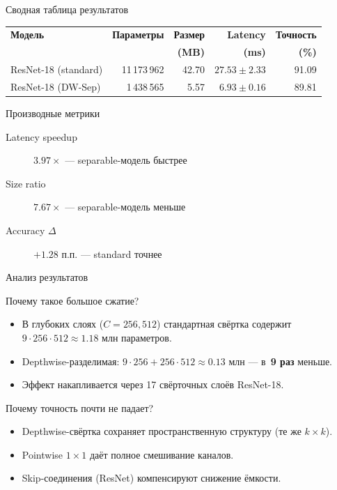 \documentclass[11pt,aspectratio=169]{beamer}
\begin{document}
\begin{frame}{Сводная таблица результатов}
  \centering
  \begin{tabular}{lrrrr}
    \toprule
    \textbf{Модель} & \textbf{Параметры} & \textbf{Размер} & \textbf{Latency} & \textbf{Точность} \\
                     &                     & \textbf{(MB)}   & \textbf{(ms)}    & \textbf{(\%)} \\
    \midrule
    ResNet-18 (standard)
        & 11\,173\,962 & 42.70 & \(27.53 \pm 2.33\) & 91.09 \\
    \addlinespace
    ResNet-18 (DW-Sep)
        & 1\,438\,565  & 5.57  & \(6.93 \pm 0.16\)  & 89.81 \\
    \bottomrule
  \end{tabular}

  \vspace{12pt}

  \begin{block}{Производные метрики}
    \begin{description}
      \item[Latency speedup] \(\mathbf{3.97\times}\) — separable-модель быстрее
      \item[Size ratio] \(\mathbf{7.67\times}\) — separable-модель меньше
      \item[Accuracy \(\Delta\)] \(+1.28\) п.п. — standard точнее
    \end{description}
  \end{block}
\end{frame}

\begin{frame}{Анализ результатов}
  \begin{block}{Почему такое большое сжатие?}
    \begin{itemize}
      \item В глубоких слоях (\(C = 256, 512\)) стандартная свёртка
            содержит \(9 \cdot 256 \cdot 512 \approx 1.18\) млн параметров.
      \item Depthwise-разделимая: \(9 \cdot 256 + 256 \cdot 512 \approx 0.13\) млн —
            в~\textbf{9 раз} меньше.
      \item Эффект накапливается через 17 свёрточных слоёв ResNet-18.
    \end{itemize}
  \end{block}

  \pause

  \begin{block}{Почему точность почти не падает?}
    \begin{itemize}
      \item Depthwise-свёртка сохраняет пространственную структуру (те же \(k \times k\)).
      \item Pointwise \(1 \times 1\) даёт полное смешивание каналов.
      \item Skip-соединения (ResNet) компенсируют снижение ёмкости.
    \end{itemize}
  \end{block}
\end{frame}
\end{document}
